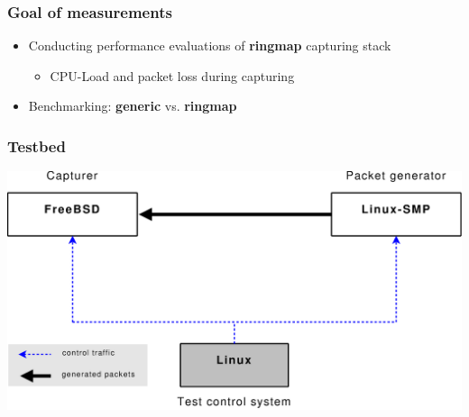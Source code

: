 \begin{frame}
\frametitle{Goal of measurements}
\begin{itemize}
	\item Conducting performance evaluations of \textbf{ringmap} capturing stack
		\begin{itemize}
			\item CPU-Load and packet loss during capturing\newline
		\end{itemize}
	\item Benchmarking: \textbf{generic} vs. \textbf{ringmap}
\end{itemize}
\end{frame}

%
%

\begin{frame}
\frametitle{Testbed}
\begin{center}
\includegraphics [height=0.68\textheight]{pics/Messaufbau}
\end{center}
\end{frame}

